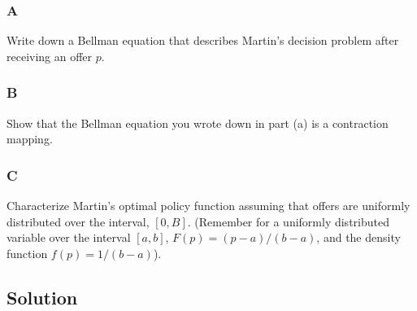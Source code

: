 \documentclass[10pt, a4paper]{article}
\begin{document}
      \subsubsection*{A} Write down a Bellman equation that describes Martin's decision problem after receiving an offer $p$.
      \subsubsection*{B} Show that the Bellman equation you wrote down in part (a) is a contraction mapping.
      \subsubsection*{C} Characterize Martin's optimal policy function assuming that offers are uniformly distributed over the interval, $[0,B]$. (Remember for a uniformly distributed variable over the interval $[a,b]$, $F(p) = (p-a)/(b-a)$, and the density function $f(p) = 1/(b-a)$).
    \subsection*{Solution}
\end{document}
